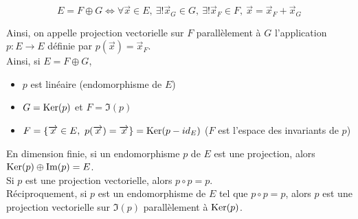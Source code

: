     \[E = F \oplus G \iff \forall \vec x \in E,\ \exists ! \vec x_G \in G,\ \exists ! \vec x_F \in F,\ \vec x = \vec x_F + \vec x_G\]

    Ainsi, on appelle projection vectorielle sur $F$ parallèlement à $G$ l'application $p : E \to E$ définie par $p(\vec x) = \vec x_F$.\\

    Ainsi, si $E = F \oplus G$,
    \begin{itemize}
        \item $p$ est linéaire (endomorphisme de $E$)
        \item $G = \operatorname{Ker}(p)$ et $F = \Im(p)$
        \item $F = \left\{\overrightarrow x \in E,\ p(\overrightarrow x) = \overrightarrow x\right\} = \operatorname{Ker}(p - id_E)$ ($F$ est l'espace des invariants de $p$)
    \end{itemize}
    \vspace{10px}
    En dimension finie, si un endomorphisme $p$ de $E$ est une projection, alors $\operatorname{Ker}(p) \oplus \Im(p) = E$.\\

    Si $p$ est une projection vectorielle, alors $p \circ p = p$.\\
    Réciproquement, si $p$ est un endomorphisme de $E$ tel que $p \circ p = p$, alors $p$ est une projection vectorielle sur $\Im(p)$ parallèlement à $\operatorname{Ker}(p)$.\\
